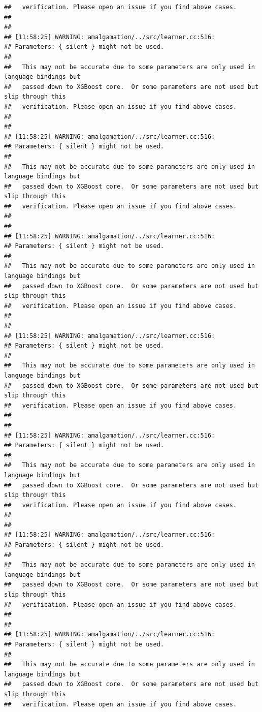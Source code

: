 \documentclass[AMS,STIX2COL]{WileyNJD-v2}\usepackage[]{graphicx}\usepackage[]{color}
\makeatletter
\newenvironment{kframe}{%
 \def\at@end@of@kframe{}%
 \ifinner\ifhmode%
  \def\at@end@of@kframe{\end{minipage}}%
  \begin{minipage}{\columnwidth}%
 \fi\fi%
 \def\FrameCommand##1{\hskip\@totalleftmargin \hskip-\fboxsep
 \colorbox{shadecolor}{##1}\hskip-\fboxsep
     \hskip-\linewidth \hskip-\@totalleftmargin \hskip\columnwidth}%
 \MakeFramed {\advance\hsize-\width
   \@totalleftmargin\z@ \linewidth\hsize
   \@setminipage}}%
 {\par\unskip\endMakeFramed%
 \at@end@of@kframe}
\newenvironment{knitrout}{}{} %
\makeatother
\begin{document}
\begin{knitrout}
\begin{kframe}
\begin{verbatim}
##   verification. Please open an issue if you find above cases.
## 
## 
## [11:58:25] WARNING: amalgamation/../src/learner.cc:516: 
## Parameters: { silent } might not be used.
## 
##   This may not be accurate due to some parameters are only used in language bindings but
##   passed down to XGBoost core.  Or some parameters are not used but slip through this
##   verification. Please open an issue if you find above cases.
## 
## 
## [11:58:25] WARNING: amalgamation/../src/learner.cc:516: 
## Parameters: { silent } might not be used.
## 
##   This may not be accurate due to some parameters are only used in language bindings but
##   passed down to XGBoost core.  Or some parameters are not used but slip through this
##   verification. Please open an issue if you find above cases.
## 
## 
## [11:58:25] WARNING: amalgamation/../src/learner.cc:516: 
## Parameters: { silent } might not be used.
## 
##   This may not be accurate due to some parameters are only used in language bindings but
##   passed down to XGBoost core.  Or some parameters are not used but slip through this
##   verification. Please open an issue if you find above cases.
## 
## 
## [11:58:25] WARNING: amalgamation/../src/learner.cc:516: 
## Parameters: { silent } might not be used.
## 
##   This may not be accurate due to some parameters are only used in language bindings but
##   passed down to XGBoost core.  Or some parameters are not used but slip through this
##   verification. Please open an issue if you find above cases.
## 
## 
## [11:58:25] WARNING: amalgamation/../src/learner.cc:516: 
## Parameters: { silent } might not be used.
## 
##   This may not be accurate due to some parameters are only used in language bindings but
##   passed down to XGBoost core.  Or some parameters are not used but slip through this
##   verification. Please open an issue if you find above cases.
## 
## 
## [11:58:25] WARNING: amalgamation/../src/learner.cc:516: 
## Parameters: { silent } might not be used.
## 
##   This may not be accurate due to some parameters are only used in language bindings but
##   passed down to XGBoost core.  Or some parameters are not used but slip through this
##   verification. Please open an issue if you find above cases.
## 
## 
## [11:58:25] WARNING: amalgamation/../src/learner.cc:516: 
## Parameters: { silent } might not be used.
## 
##   This may not be accurate due to some parameters are only used in language bindings but
##   passed down to XGBoost core.  Or some parameters are not used but slip through this
##   verification. Please open an issue if you find above cases.

\end{verbatim}
\end{kframe}
\end{knitrout}
\end{document}
